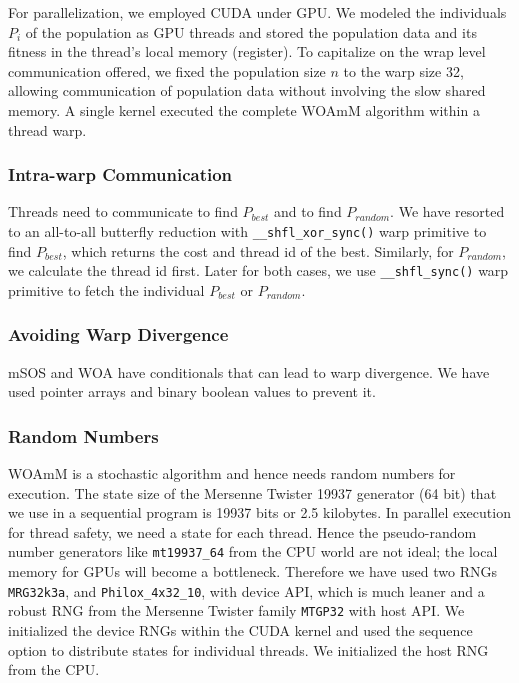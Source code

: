 \documentclass[conference]{IEEEtran}
\begin{document}
For parallelization, we employed CUDA under GPU. 
We modeled the individuals $P_i$ of the population as GPU threads and stored the population data and its fitness in the thread’s local memory (register). 
To capitalize on the wrap level communication offered, we fixed the population size $n$ to the warp size 32, allowing communication of population data without involving the slow shared memory. 
A single kernel executed the complete WOAmM algorithm within a thread warp.

\subsubsection{Intra-warp Communication}

Threads need to communicate to find $P_{best}$ and to find $P_{random}$. 
We have resorted to an all-to-all butterfly reduction with \lstinline{__shfl_xor_sync()} warp primitive to find $P_{best}$, which returns the cost and thread id of the best. 
Similarly, for $P_{random}$, we calculate the thread id first. 
Later for both cases, we use \lstinline{__shfl_sync()} warp primitive to fetch the individual $P_{best}$ or $P_{random}$.

\subsubsection{Avoiding Warp Divergence}

mSOS and WOA have conditionals that can lead to warp divergence. 
We have used pointer arrays and binary boolean values to prevent it.

\subsubsection{Random Numbers}

WOAmM is a stochastic algorithm and hence needs random numbers for execution. 
The state size of the Mersenne Twister 19937 generator (64 bit) that we use in a sequential program is 19937 bits or 2.5 kilobytes. 
In parallel execution for thread safety, we need a state for each thread. 
Hence the pseudo-random number generators like \lstinline{mt19937_64} from the CPU world are not ideal; the local memory for GPUs will become a bottleneck. 
Therefore we have used two RNGs \lstinline{MRG32k3a}, and \lstinline{Philox_4x32_10}, with device API, which is much leaner and a  robust RNG from the Mersenne Twister family \lstinline{MTGP32} with host API.
We initialized the device RNGs within the CUDA kernel and used the sequence option to distribute states for individual threads.  
We initialized the host RNG from the CPU.
\end{document}
